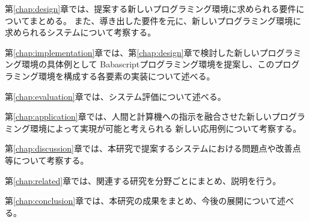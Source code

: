 第\ref{chap:design}章では、提案する新しいプログラミング環境に求められる要件についてまとめる。
また、導き出した要件を元に、新しいプログラミング環境に求められるシステムについて考察する。

第\ref{chap:implementation}章では、第\ref{chap:design}章で検討した新しいプログラミング環境の具体例として
Babascriptプログラミング環境を提案し、このプログラミング環境を構成する各要素の実装について述べる。

第\ref{chap:evaluation}章では、システム評価について述べる。

第\ref{chap:application}章では、人間と計算機への指示を融合させた新しいプログラミング環境によって実現が可能と考えられる
新しい応用例について考察する。

第\ref{chap:discussion}章では、本研究で提案するシステムにおける問題点や改善点等について考察する。

第\ref{chap:related}章では、関連する研究を分野ごとにまとめ、説明を行う。

第\ref{chap:conclusion}章では、本研究の成果をまとめ、今後の展開について述べる。

